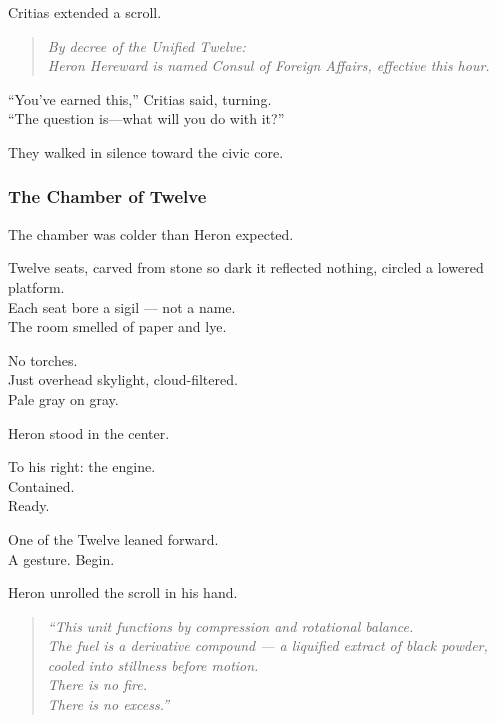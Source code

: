 \documentclass[12pt]{article}
\begin{document}
\vspace{1em}

Critias extended a scroll.

\begin{quote}
\textit{By decree of the Unified Twelve:\\
Heron Hereward is named Consul of Foreign Affairs, effective this hour.}
\end{quote}

\vspace{1em}

“You’ve earned this,” Critias said, turning.\\
“The question is—what will you do with it?”

\vspace{1em}

They walked in silence toward the civic core.

\dotfill

\subsubsection*{The Chamber of Twelve}

The chamber was colder than Heron expected.

Twelve seats, carved from stone so dark it reflected nothing, circled a lowered platform.\\
Each seat bore a sigil — not a name.\\
The room smelled of paper and lye.

No torches.\\
Just overhead skylight, cloud-filtered.\\
Pale gray on gray.

Heron stood in the center.

To his right: the engine.\\
Contained.\\
Ready.

\vspace{1em}

One of the Twelve leaned forward.\\
A gesture.  
Begin.

\vspace{1em}

Heron unrolled the scroll in his hand.

\begin{quote}
\textit{“This unit functions by compression and rotational balance.\\
The fuel is a derivative compound — a liquified extract of black powder, cooled into stillness before motion.\\
There is no fire.\\
There is no excess.”}
\end{quote}
\end{document}
